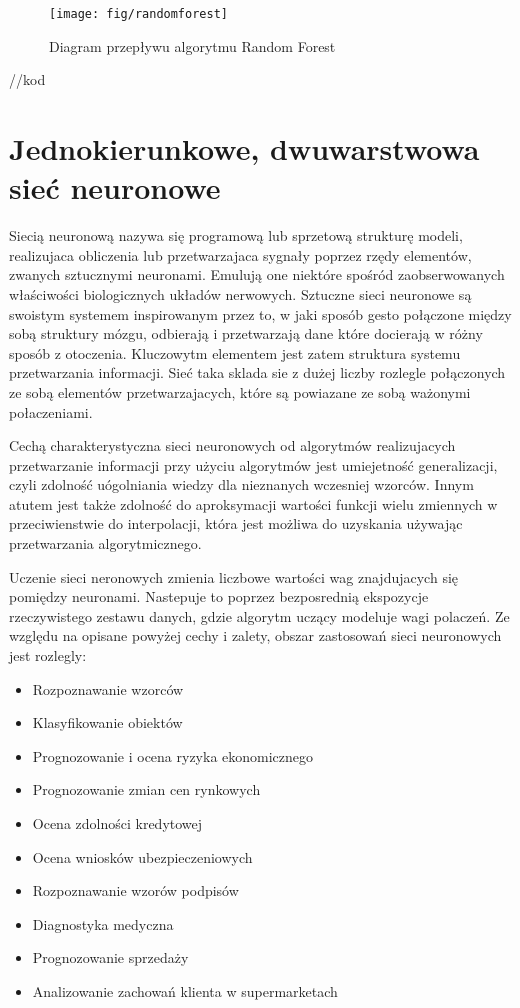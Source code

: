 \documentclass[brudnopis]{xmgr}
\begin{document}
\begin{figure}[!tbh]
\centering
\texttt{[image: fig/randomforest]}
\caption{Diagram przepływu algorytmu Random Forest}
\end{figure}
\newpage

//kod

\section{Jednokierunkowe, dwuwarstwowa sieć neuronowe}

Siecią neuronową nazywa się programową lub sprzetową strukturę modeli, realizujaca obliczenia lub przetwarzajaca sygnały poprzez rzędy elementów, zwanych sztucznymi neuronami. Emulują one niektóre spośród zaobserwowanych właściwości biologicznych układów nerwowych. Sztuczne sieci neuronowe są swoistym systemem inspirowanym przez to, w jaki sposób gesto połączone między sobą struktury mózgu, odbierają i przetwarzają dane które docierają w różny sposób z otoczenia. Kluczowytm elementem jest zatem struktura systemu przetwarzania informacji. Sieć taka sklada sie z dużej liczby rozlegle połączonych ze sobą elementów przetwarzajacych, które są powiazane ze sobą ważonymi połaczeniami.

Cechą charakterystyczna sieci neuronowych od algorytmów realizujacych przetwarzanie informacji przy użyciu algorytmów jest umiejetność generalizacji, czyli zdolność uógolniania wiedzy dla nieznanych wczesniej wzorców. Innym atutem jest także zdolność do aproksymacji wartości funkcji wielu zmiennych w przeciwienstwie do interpolacji, która jest możliwa do uzyskania używając przetwarzania algorytmicznego.

Uczenie sieci neronowych zmienia liczbowe wartości wag znajdujacych się pomiędzy neuronami. Nastepuje to poprzez bezposrednią ekspozycje rzeczywistego zestawu danych, gdzie algorytm uczący modeluje wagi polaczeń. Ze względu na opisane powyżej cechy i zalety, obszar zastosowań sieci neuronowych jest rozlegly:

\begin{itemize}
\item
Rozpoznawanie wzorców
\item
Klasyfikowanie obiektów
\item
Prognozowanie i ocena ryzyka ekonomicznego
\item
Prognozowanie zmian cen rynkowych
\item
Ocena zdolności kredytowej
\item
Ocena wniosków ubezpieczeniowych
\item
Rozpoznawanie wzorów podpisów
\item
Diagnostyka medyczna
\item
Prognozowanie sprzedaży
\item
Analizowanie zachowań klienta w supermarketach
\end{itemize}
\end{document}
